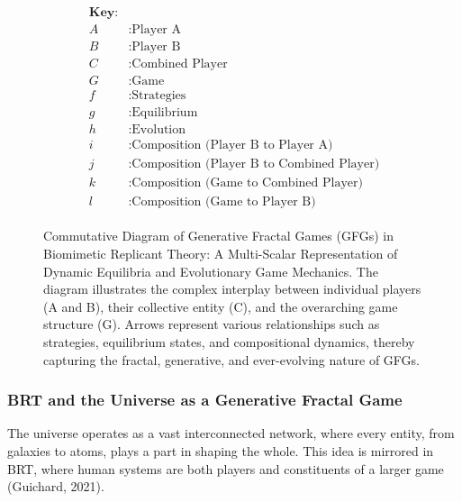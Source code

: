 \documentclass[sn-nature]{sn-jnl}%
\theoremstyle{thmstyleone}%
\theoremstyle{thmstyletwo}%
\theoremstyle{thmstylethree}%
\begin{document}
\begin{figure}[h]
\centering
\begin{minipage}{0.55\textwidth}  %
\centering
{}
\end{minipage}%
\begin{minipage}{0.35\textwidth}  %
\begin{align*}
\boxed{
\begin{aligned}
\textbf{Key:} \\
A & : \text{Player A} \\
B & : \text{Player B} \\
C & : \text{Combined Player} \\
G & : \text{Game} \\
f & : \text{Strategies} \\
g & : \text{Equilibrium} \\
h & : \text{Evolution} \\
i & : \text{Composition (Player B to Player A)} \\
j & : \text{Composition (Player B to Combined Player)} \\
k & : \text{Composition (Game to Combined Player)} \\
l & : \text{Composition (Game to Player B)}
\end{aligned}
}
\end{align*}
\end{minipage}
\caption[Commutative Diagram of Generative Fractal Games]{Commutative Diagram of Generative Fractal Games (GFGs) in Biomimetic Replicant Theory: A Multi-Scalar Representation of Dynamic Equilibria and Evolutionary Game Mechanics. The diagram illustrates the complex interplay between individual players (A and B), their collective entity (C), and the overarching game structure (G). Arrows represent various relationships such as strategies, equilibrium states, and compositional dynamics, thereby capturing the fractal, generative, and ever-evolving nature of GFGs.}
\label{marker}
\end{figure}


\subsubsection{BRT and the Universe as a Generative Fractal Game}
The universe operates as a vast interconnected network, where every entity, from galaxies to atoms, plays a part in shaping the whole. This idea is mirrored in BRT, where human systems are both players and constituents of a larger game (Guichard, 2021).
\end{document}

